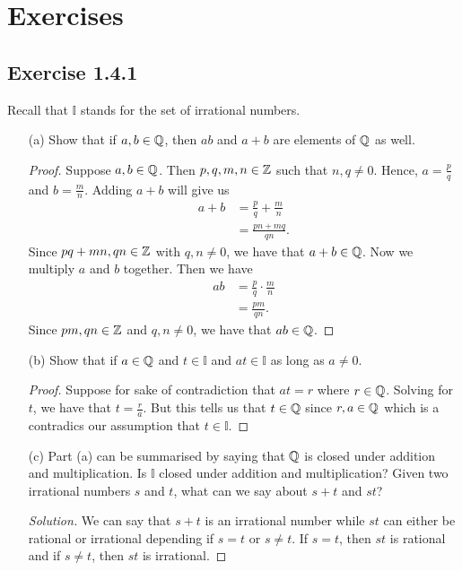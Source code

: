 \section{Exercises}

\subsection{Exercise 1.4.1} Recall that \( \mathbb{I}\) stands for the set of irrational numbers. 

\begin{enumerate}
    \item[(a)] Show that if \( a,b \in \mathbb{Q} \), then \( ab \) and \( a + b \) are elements of \( \mathbb{Q} \) as well. 
        
    
    \begin{proof}
        Suppose \( a,b \in \mathbb{Q} \). Then \( p,q,m,n \in \mathbb{Z} \) such that \( n, q \neq 0 \). Hence, \( a = \frac{p}{q} \) and \( b = \frac{m}{n}\). Adding \( a + b \) will give us 
        \begin{align*}
            a + b &= \frac{p}{q} + \frac{m}{n} \\ 
                  &= \frac{pn + mq}{qn}. 
        \end{align*}
        Since \( pq + mn, qn \in \mathbb{Z} \) with \( q,n \neq 0 \), we have that \( a + b \in \mathbb{Q} \). Now we multiply \( a \) and \( b \) together. Then we have 
        \begin{align*}
            ab &= \frac{p}{q} \cdot \frac{m}{n} \\ 
               &= \frac{pm}{qn}.
        \end{align*}
        Since \( pm, qn \in \mathbb{Z} \) and \( q,n \neq 0 \), we have that \( ab \in \mathbb{Q} \).
    \end{proof}

    \item[(b)] Show that if \( a \in \mathbb{Q}  \) and \( t \in \mathbb{I} \) and \( at \in \mathbb{I} \) as long as \( a \neq 0 \). 
    \begin{proof}
       Suppose for sake of contradiction that \( at = r \) where \( r \in \mathbb{Q} \). Solving for \( t \), we have that \( t = \frac{r}{a} \). But this tells us that \( t \in \mathbb{Q} \) since \( r, a \in \mathbb{Q} \) which is a contradics our assumption that \( t \in \mathbb{I} \).
    
    \end{proof}
     
    \item[(c)] Part (a) can be summarised by saying that \( \mathbb{Q} \) is closed under addition and multiplication. Is \( \mathbb{I} \) closed under addition and multiplication? Given two irrational numbers \( s \) and \( t \), what can we say about \( s + t \) and \( st\)?
        
    
    \begin{proof}[Solution]
        We can say that \( s + t \) is an irrational number while \( st \) can either be rational or irrational depending if \( s = t \) or \( s \neq t \). If \( s = t \), then \( st \) is rational and if \( s \neq t \), then \( st \) is irrational. 
    \end{proof}
    
\end{enumerate}

